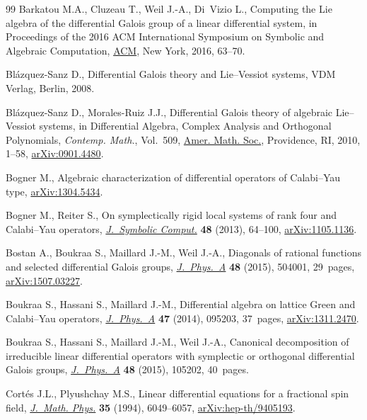 \documentclass[pdftex]{sigma}%
\numberwithin{equation}{section}
\begin{document}
\begin{thebibliography}{99}
Barkatou M.A., Cluzeau T., Weil J.-A., Di~Vizio L., Computing the {L}ie algebra
 of the differential {G}alois group of a linear differential system, in
 Proceedings of the 2016 {ACM} {I}nternational {S}ymposium on {S}ymbolic and
 {A}lgebraic {C}omputation, \href{https://doi.org/10.1145/2930889.2930932}{ACM}, New York, 2016, 63--70.

Bl\'azquez-Sanz D., Differential {G}alois theory and {L}ie--{V}essiot systems,
 {VDM} Verlag, Berlin, 2008.

Bl\'azquez-Sanz D., Morales-Ruiz J.J., Differential {G}alois theory of
 algebraic {L}ie--{V}essiot systems, in Differential Algebra, Complex Analysis
 and Orthogonal Polynomials, \textit{Contemp. Math.}, Vol.~509, \href{https://doi.org/10.1090/conm/509/09973}{Amer. Math.
 Soc.}, Providence, RI, 2010, 1--58, \href{https://arxiv.org/abs/0901.4480}{arXiv:0901.4480}.

Bogner M., Algebraic characterization of differential operators of
 {C}alabi--{Y}au type, \href{https://arxiv.org/abs/1304.5434}{arXiv:1304.5434}.

Bogner M., Reiter S., On symplectically rigid local systems of rank four and
 {C}alabi--{Y}au operators, \href{https://doi.org/10.1016/j.jsc.2011.11.007}{\textit{J.~Symbolic Comput.}} \textbf{48} (2013),
 64--100, \href{https://arxiv.org/abs/1105.1136}{arXiv:1105.1136}.

Bostan A., Boukraa S., Maillard J.-M., Weil J.-A., Diagonals of rational
 functions and selected differential {G}alois groups, \href{https://doi.org/10.1088/1751-8113/48/50/504001}{\textit{J.~Phys.~A}}
 \textbf{48} (2015), 504001, 29~pages, \href{https://arxiv.org/abs/1507.03227}{arXiv:1507.03227}.

Boukraa S., Hassani S., Maillard J.-M., Differential algebra on lattice {G}reen
 and {C}alabi--{Y}au operators, \href{https://doi.org/10.1088/1751-8113/47/9/095203}{\textit{J.~Phys.~A}} \textbf{47} (2014),
 095203, 37~pages, \href{https://arxiv.org/abs/1311.2470}{arXiv:1311.2470}.

Boukraa S., Hassani S., Maillard J.-M., Weil J.-A., Canonical decomposition of
 irreducible linear differential operators with symplectic or orthogonal
 differential {G}alois groups, \href{https://doi.org/10.1088/1751-8113/48/10/105202}{\textit{J.~Phys.~A}} \textbf{48} (2015), 105202,
 40~pages.

Cort\'es J.L., Plyushchay M.S., Linear differential equations for a fractional
 spin field, \href{https://doi.org/10.1063/1.530727}{\textit{J.~Math. Phys.}} \textbf{35} (1994), 6049--6057,
 \href{https://arxiv.org/abs/hep-th/9405193}{arXiv:hep-th/9405193}.


\end{thebibliography}
\end{document}
